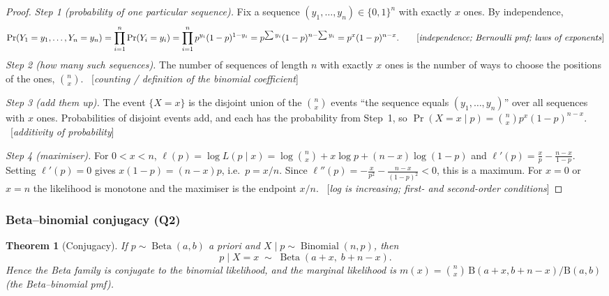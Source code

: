 \documentclass[11pt]{article}
\newtheorem{theorem}{Theorem}
\theoremstyle{definition}
\theoremstyle{remark}
\renewcommand{\Pr}{\operatorname{Pr}}
\newcommand{\Bin}{\operatorname{Binomial}}
\newcommand{\Betad}{\operatorname{Beta}}
\newcommand{\Bfun}{\mathrm{B}}
\newcommand{\rulename}[1]{\ {[\emph{#1}]}}
\begin{document}
\begin{proof}
\emph{Step 1 (probability of one particular sequence).}
Fix a sequence $(y_1,\dots,y_n)\in\{0,1\}^n$ with exactly $x$ ones. By independence,
\[
\Pr(Y_1=y_1,\dots,Y_n=y_n)=\prod_{i=1}^n\Pr(Y_i=y_i)=\prod_{i=1}^n p^{y_i}(1-p)^{1-y_i}
= p^{\sum y_i}(1-p)^{n-\sum y_i}=p^{x}(1-p)^{n-x}.
\tag*{[\emph{independence; Bernoulli pmf; laws of exponents}]}
\]
\emph{Step 2 (how many such sequences).}
The number of sequences of length $n$ with exactly $x$ ones is the number of ways to choose the
positions of the ones, $\binom nx$. \rulename{counting / definition of the binomial coefficient}

\emph{Step 3 (add them up).}
The event $\{X=x\}$ is the disjoint union of the $\binom nx$ events ``the sequence equals $(y_1,\dots,y_n)$''
over all sequences with $x$ ones. Probabilities of disjoint events add, and each has the probability from
Step~1, so $\Pr(X=x\mid p)=\binom nx p^x(1-p)^{n-x}$. \rulename{additivity of probability}

\emph{Step 4 (maximiser).}
For $0<x<n$, $\ell(p)=\log L(p\mid x)=\log\binom nx+x\log p+(n-x)\log(1-p)$ and
$\ell'(p)=\frac xp-\frac{n-x}{1-p}$. Setting $\ell'(p)=0$ gives $x(1-p)=(n-x)p$, i.e.\ $p=x/n$.
Since $\ell''(p)=-\frac x{p^2}-\frac{n-x}{(1-p)^2}<0$, this is a maximum. For $x=0$ or $x=n$ the
likelihood is monotone and the maximiser is the endpoint $x/n$.
\rulename{log is increasing; first- and second-order conditions}
\end{proof}

\subsubsection{Beta--binomial conjugacy (Q2)}

\begin{theorem}[Conjugacy]\label{thm:conj}
If $p\sim\Betad(a,b)$ a priori and $X\mid p\sim\Bin(n,p)$, then
\[
p\mid X=x\;\sim\;\Betad(a+x,\;b+n-x).
\]
Hence the Beta family is conjugate to the binomial likelihood, and the marginal likelihood is
$m(x)=\binom nx\,\Bfun(a+x,b+n-x)/\Bfun(a,b)$ (the Beta--binomial pmf).
\end{theorem}
\end{document}
